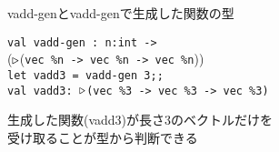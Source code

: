 \documentclass[dvipdfmx,aspectratio=169, 20pt]{beamer}
\begin{document}
\begin{frame}[fragile]{vadd-genとvadd-genで生成した関数の型}
    \newcommand{\Vn}{\text{vec}\ \%n}
    \newcommand{\Vt}{\text{vec}\ \%3}
    \begin{exampleblock}{}
        \hspace{5mm} \verb|val vadd-gen : n:int -> | \\
        \hspace{20mm} (${\mathop{\triangleright}}$(\verb|vec %n -> vec %n -> vec %n|)) \\[2mm]
        \hspace{5mm} \verb|let vadd3 = vadd-gen 3;;| \\
        \hspace{5mm} \verb|val vadd3: |${\mathop{\triangleright}}$\verb|(vec %3 -> vec %3 -> vec %3)|
    \end{exampleblock}
    生成した関数(vadd3)が長さ3のベクトルだけを\\受け取ることが型から判断できる
\end{frame}
\end{document}
